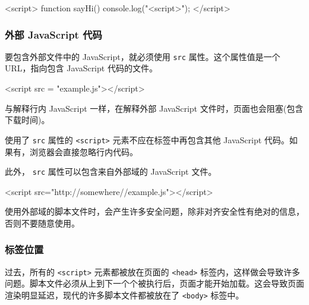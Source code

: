 \begin{HTML}
<script>
    function sayHi() {
        console.log("<\/script>");
    }
</script>
\end{HTML}

\subsubsection*{外部 JavaScript 代码}

要包含外部文件中的 JavaScript，就必须使用 \texttt{src} 属性。这个属性值是一个 URL，指向包含 JavaScript 代码的文件。

\begin{HTML}
<script src = "example.js"></script>
\end{HTML}

与解释行内 JavaScript 一样，在解释外部 JavaScript 文件时，页面也会阻塞(包含下载时间)。


使用了 \texttt{src} 属性的 \texttt{<script>} 元素不应在标签中再包含其他 JavaScript 代码。如果有，浏览器会直接忽略行内代码。

此外， \texttt{src} 属性可以包含来自外部域的 JavaScript 文件。

\begin{HTML}
<script src="http://somewhere//example.js"></script>
\end{HTML}

使用外部域的脚本文件时，会产生许多安全问题，除非对齐安全性有绝对的信息，否则不要随意使用。


\subsubsection*{标签位置}

过去，所有的 \texttt{<script>} 元素都被放在页面的 \texttt{<head>} 标签内，这样做会导致许多问题。脚本文件必须从上到下一个个被执行后，页面才能开始加载。这会导致页面渲染明显延迟，现代的许多脚本文件都被放在了 \texttt{<body>} 标签中。

